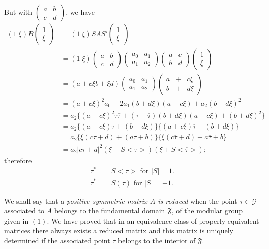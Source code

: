 \begin{defi*}
But with $\left(\begin{smallmatrix}
  a&b\\c&d \end{smallmatrix}\right)$, we have
\begin{align*}
(1 \; \xi) B \begin{pmatrix} 1\\\xi
  \end{pmatrix} & = (1 \; \xi) S A S' \begin{pmatrix}
1\\\xi
  \end{pmatrix}\\
& = (1 \; \xi) \begin{pmatrix}
a&b\\c&d
  \end{pmatrix} \begin{pmatrix}
a_0 &a_1 \\a_1 &a_2
  \end{pmatrix} \begin{pmatrix}
a&c\\b&d
  \end{pmatrix} \begin{pmatrix}
1\\\xi
  \end{pmatrix}\\
& = (a+c\xi b+\xi d) \begin{pmatrix}
a_0& a_1\\a_1& a_2
  \end{pmatrix} \begin{pmatrix}
a&+&c\xi\\
b &+& d\xi
  \end{pmatrix}\\
& = (a+c\xi)^2 a_0 + 2 a_1 (b+d\xi) (a+c\xi) + a_2 (b+d\xi)^2\\
& = a_2 \{(a+c\xi)^2 \tau \overline{\tau} + (\tau + \overline{\tau})
  (b+ d\xi) (a+c\xi) + (b+d\xi)^2\}\\
& = a_2 \{(a+c\xi) \tau + (b+d\xi)\} \{(a+c\xi)
  \overline{\tau}+(b+d\xi)\} \\
& = a_2 \{\xi (c\tau + d) + (a\tau + b)\} \{\xi (c\overline{\tau}+d) +
  a \overline{\tau}+b\}\\
& = a_2 |c\tau + d|^2 (\xi+S<\tau>) (\xi + S<\overline{\tau}>);
\end{align*}\pageoriginale
therefore 
\begin{align*}
\tau^{\ast} & = S <\tau> \text{ for } |S|=1.\\
\tau^{\ast} & = S (\overline{\tau}) \text{ for } |S|=-1.
\end{align*}

We shall say that a \textit{positive symmetric matrix $A$ is reduced}
when the point $\tau \in \mathscr{G}$ associated to $A$
belongs to the fundamental domain $\mathfrak{F}$, of the modular group
given in $(1)$. We have proved that in an equivalence class of properly
equivalent matrices there always exists a reduced matrix and this
matrix is uniquely determined if the associated point $\tau$ belongs
to the interior of $\mathfrak{F}$.
\end{defi*}

